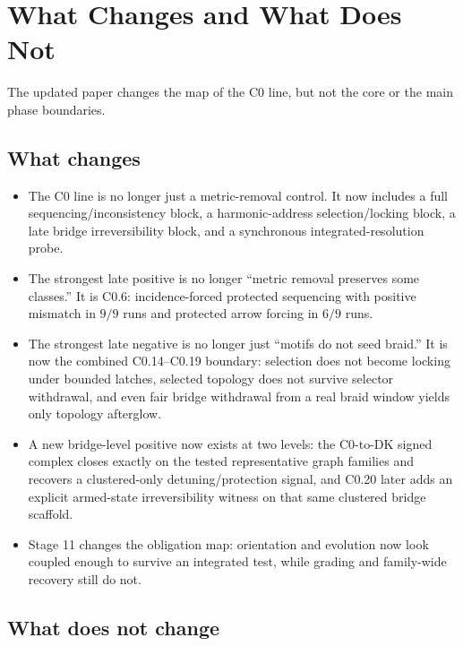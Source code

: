 \documentclass[11pt]{article}
\begin{document}
\section{What Changes and What Does Not}

The updated paper changes the map of the C0 line, but not the core or the main phase boundaries.

\subsection{What changes}

\begin{itemize}
\item The C0 line is no longer just a metric-removal control. It now includes a full sequencing/inconsistency block, a harmonic-address selection/locking block, a late bridge irreversibility block, and a synchronous integrated-resolution probe.
\item The strongest late positive is no longer ``metric removal preserves some classes.'' It is C0.6: incidence-forced protected sequencing with positive mismatch in $9/9$ runs and protected arrow forcing in $6/9$ runs.
\item The strongest late negative is no longer just ``motifs do not seed braid.'' It is now the combined C0.14--C0.19 boundary: selection does not become locking under bounded latches, selected topology does not survive selector withdrawal, and even fair bridge withdrawal from a real braid window yields only topology afterglow.
\item A new bridge-level positive now exists at two levels: the C0-to-DK signed complex closes exactly on the tested representative graph families and recovers a clustered-only detuning/protection signal, and C0.20 later adds an explicit armed-state irreversibility witness on that same clustered bridge scaffold.
\item Stage 11 changes the obligation map: orientation and evolution now look coupled enough to survive an integrated test, while grading and family-wide recovery still do not.
\end{itemize}

\subsection{What does not change}
\end{document}
